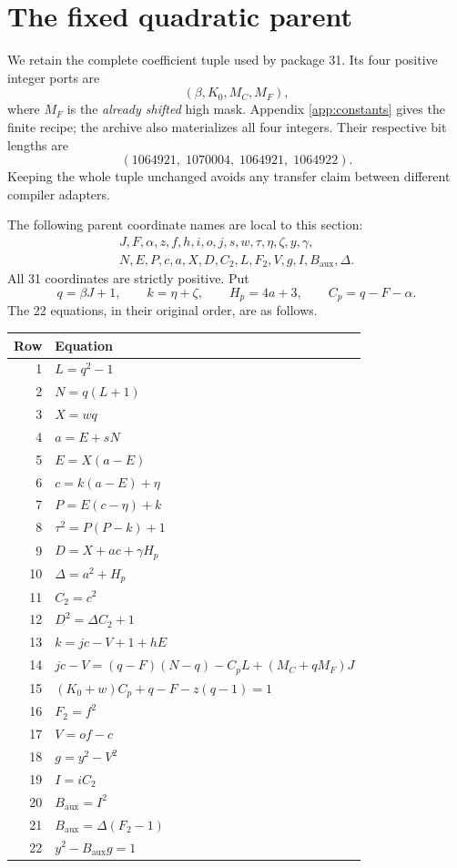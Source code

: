 \documentclass[11pt]{article}
\theoremstyle{definition}
\theoremstyle{remark}
\numberwithin{equation}{section}
\begin{document}
\section{The fixed quadratic parent}
\label{sec:parent}

We retain the complete coefficient tuple used by package 31. Its four
positive integer ports are
\[
 (\beta,K_0,M_C,M_F),
\]
where \(M_F\) is the \emph{already shifted} high mask.
Appendix \ref{app:constants} gives the finite recipe; the archive also
materializes all four integers. Their respective bit lengths are
\[
 (1064921,\;1070004,\;1064921,\;1064922).
\]
Keeping the whole tuple unchanged avoids any transfer claim between
different compiler adapters.

The following parent coordinate names are local to this section:
\[
\begin{gathered}
 J,F,\alpha,z,f,h,i,o,j,s,w,\tau,\eta,\zeta,y,\gamma,\\
 N,E,P,c,a,X,D,C_2,L,F_2,V,g,I,B_{\mathrm{aux}},\Delta .
\end{gathered}
\]
All 31 coordinates are strictly positive. Put
\[
 q=\beta J+1,\qquad k=\eta+\zeta,\qquad
 H_p=4a+3,\qquad C_p=q-F-\alpha.
\]
The 22 equations, in their original order, are as follows.

\begin{longtable}{@{}r@{\qquad}l@{}}
\toprule
Row & Equation\\
\midrule
\endhead
1 & \(L=q^2-1\)\\[2pt]
2 & \(N=q(L+1)\)\\[2pt]
3 & \(X=wq\)\\[2pt]
4 & \(a=E+sN\)\\[2pt]
5 & \(E=X(a-E)\)\\[2pt]
6 & \(c=k(a-E)+\eta\)\\[2pt]
7 & \(P=E(c-\eta)+k\)\\[2pt]
8 & \(\tau^2=P(P-k)+1\)\\[2pt]
9 & \(D=X+ac+\gamma H_p\)\\[2pt]
10 & \(\Delta=a^2+H_p\)\\[2pt]
11 & \(C_2=c^2\)\\[2pt]
12 & \(D^2=\Delta C_2+1\)\\[2pt]
13 & \(k=jc-V+1+hE\)\\[2pt]
14 & \(jc-V=(q-F)(N-q)-C_pL+(M_C+qM_F)J\)\\[2pt]
15 & \((K_0+w)C_p+q-F-z(q-1)=1\)\\[2pt]
16 & \(F_2=f^2\)\\[2pt]
17 & \(V=of-c\)\\[2pt]
18 & \(g=y^2-V^2\)\\[2pt]
19 & \(I=iC_2\)\\[2pt]
20 & \(B_{\mathrm{aux}}=I^2\)\\[2pt]
21 & \(B_{\mathrm{aux}}=\Delta(F_2-1)\)\\[2pt]
22 & \(y^2-B_{\mathrm{aux}}g=1\)\\
\bottomrule
\end{longtable}
\end{document}
